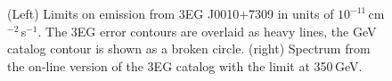 \begin{figure}[t]
\caption{\label{FIG::OBSERVATIONS::J0010} (Left) Limits on emission from 
3EG J0010$+$7309 in units of $10^{-11}$\,cm$^{-2}$\,s$^{-1}$. The 3EG
error contours are overlaid as heavy lines, the GeV catalog contour is
shown as a broken circle. (right) Spectrum from the on-line version of
the 3EG catalog with the limit at 350\,GeV.}
\end{figure}

